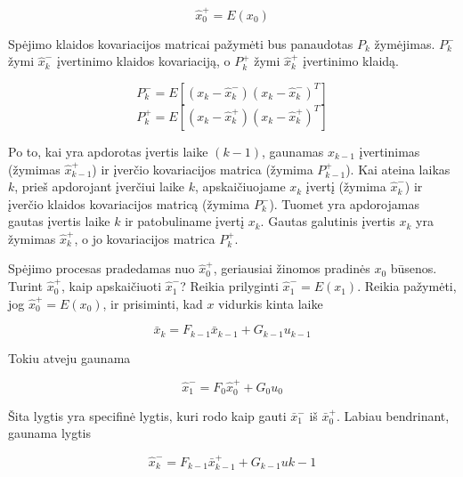 \documentclass[12pt, a4paper, lithuanian]{article}
\begin{document}
        \begin{equation}
            \hat{x}_0^+ = E(x_0)
        \end{equation}

        Spėjimo klaidos kovariacijos matricai pažymėti bus panaudotas $P_k$ žymėjimas.
        $P_k^-$ žymi $\hat{x}_k^-$ įvertinimo klaidos kovariaciją, o $P_k^+$ žymi $\hat{x}_k^+$ įvertinimo klaidą.

        \begin{equation}
            P_k^- = E[(x_k - \hat{x}_k^-)(x_k - \hat{x}_k^-)^T]
        \end{equation}
        \begin{equation}
            P_k^+ = E[(x_k - \hat{x}_k^+)(x_k-\hat{x}_k^+)^T]
        \end{equation}

        Po to, kai yra apdorotas įvertis laike $(k-1)$, gaunamas $x_{k-1}$ įvertinimas (žymimas $\hat{x}_{k-1}^+$) ir įverčio kovariacijos matrica (žymima $P_{k-1}^+$).
        Kai ateina laikas $k$, prieš apdorojant įverčiui laike $k$, apskaičiuojame $x_k$ įvertį (žymima $\hat{x}_k^-$) ir įverčio klaidos kovariacijos matricą (žymima $P_k^-$).
        Tuomet yra apdorojamas gautas įvertis laike $k$ ir patobuliname įvertį $x_k$.
        Gautas galutinis įvertis $x_k$ yra žymimas $\hat{x}_k^+$, o jo kovariacijos matrica $P_k^+$.

        Spėjimo procesas pradedamas nuo $\hat{x}_0^+$, geriausiai žinomos pradinės $x_0$ būsenos.
        Turint $\hat{x}_0^+$, kaip apskaičiuoti $\hat{x}_1^-$?
        Reikia prilyginti $\hat{x}_1^- = E(x_1)$.
        Reikia pažymėti, jog $\hat{x}_0^+ = E(x_0)$, ir prisiminti, kad $x$ vidurkis kinta laike

        \begin{equation}
            \bar{x}_k = F_{k-1}\bar{x}_{k-1} + G_{k-1}u_{k-1}
        \end{equation}
        
        Tokiu atveju gaunama

        \begin{equation}
            \hat{x}_1^- = F_0\hat{x}_0^+ + G_0u_0
        \end{equation}

        Šita lygtis yra specifinė lygtis, kuri rodo kaip gauti $\bar{x}_1^-$ iš $\bar{x}_0^+$. Labiau bendrinant, gaunama lygtis

        \begin{equation}
            \hat{x}_k^- = F_{k-1}\bar{x}_{k-1}^+ + G_{k-1}u{k-1}
        \end{equation}
\end{document}
